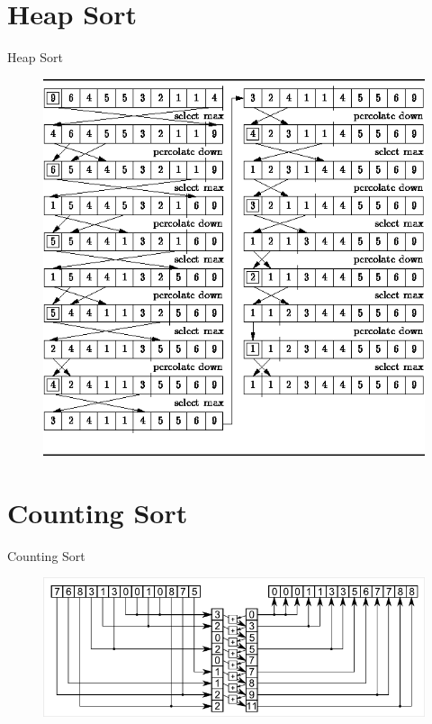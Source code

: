 \documentclass{beamer}
\begin{document}
\section{Heap Sort}
\begin{frame}{Heap Sort}
    \begin{figure}[h]
        \includegraphics[scale=0.4]{heap/heap}
    \end{figure}
\end{frame}
\section{Counting Sort}
\begin{frame}{Counting Sort}
    \begin{figure}[h]
        \includegraphics[width=\textwidth]{counting/counting}
    \end{figure}
\end{frame}
\end{document}
